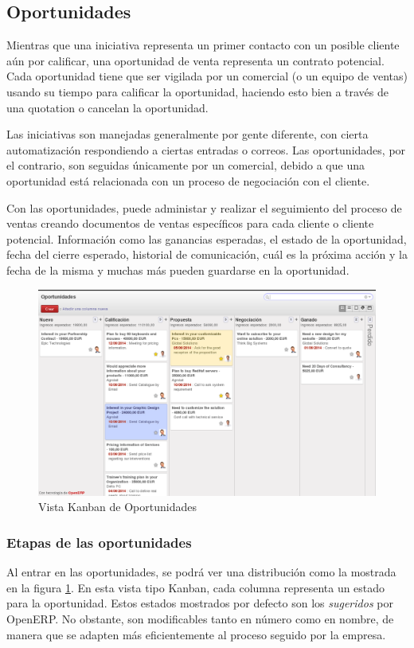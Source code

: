 \vspace{2cm}
\subsection{Oportunidades}
Mientras que una iniciativa representa un primer contacto con un posible cliente aún por calificar, una oportunidad de venta representa un contrato potencial. Cada oportunidad tiene que ser vigilada por un comercial (o un equipo de ventas) usando su tiempo para calificar la oportunidad, haciendo esto bien a través de una quotation o cancelan la oportunidad.

Las iniciativas son manejadas generalmente por gente diferente, con cierta automatización respondiendo a ciertas entradas o correos. Las oportunidades, por el contrario, son seguidas únicamente por un comercial, debido a que una oportunidad está relacionada con un proceso de negociación con el cliente.

Con las oportunidades, puede administar y realizar el seguimiento del proceso de ventas creando documentos de ventas específicos para cada cliente o cliente potencial. Información como las ganancias esperadas, el estado de la oportunidad, fecha del cierre esperado, historial de comunicación, cuál es la próxima acción y la fecha de la misma y muchas más pueden guardarse en la oportunidad.


\begin{figure}[H]
\includegraphics[width=\textwidth]{ventas/img/ven_oportunidades.png}
\caption{Vista Kanban de Oportunidades}
\label{ven:oportunidades}
\end{figure}


\subsubsection{Etapas de las oportunidades}
Al entrar en las oportunidades, se podrá ver una distribución como la mostrada en la figura \ref{ven:oportunidades}. En esta vista tipo 
Kanban, cada columna representa un estado para la oportunidad. Estos estados mostrados por defecto son los \emph{sugeridos} por OpenERP. No obstante, son modificables tanto en número como en nombre, de manera que se adapten más eficientemente al proceso seguido por la empresa.

